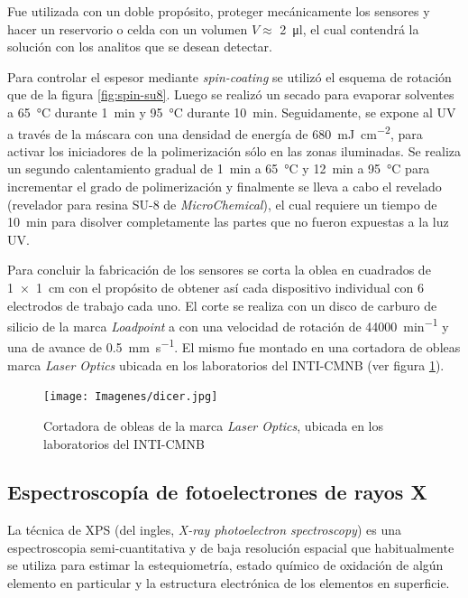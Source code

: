 		Fue utilizada con un doble propósito, proteger mecánicamente los sensores y hacer un reservorio o celda con un volumen  $V \approx$ \SI{2}{\ul}, el cual contendrá la solución con los analitos que se desean detectar.  
			
			
		Para controlar el espesor mediante \textit{spin-coating} se utilizó el esquema de rotación que de la figura \ref{fig:spin-su8}. Luego se realizó un secado para evaporar solventes a \SI{65}{\celsius} durante \SI{1}{\minute} y \SI{95}{\celsius} durante \SI{10}{\minute}. Seguidamente, se expone al UV a través de la máscara con una densidad de energía de \SI{680}{mJ.cm^{-2}}, para activar los iniciadores de la polimerización sólo en las zonas iluminadas. Se realiza un segundo calentamiento gradual de \SI{1}{\minute} a \SI{65}{\celsius} y \SI{12}{\minute} a \SI{95}{\celsius} para incrementar el grado de polimerización y finalmente se lleva a cabo el revelado (revelador para resina SU-8 de \textit{MicroChemical}), el cual requiere un tiempo de \SI{10}{\minute} para disolver completamente las partes que no fueron expuestas a la luz UV. 
		
		Para concluir la fabricación de los sensores se corta la oblea en cuadrados de \SI{1x1}{\cm} con el propósito de obtener así cada dispositivo individual con 6 electrodos de trabajo cada uno. El corte se realiza con un disco de carburo de silicio de la marca \textit{Loadpoint} a con una velocidad de rotación de \SI{44000}{\minute^{-1}} y una de avance de \SI{0.5}{\mm\per\second}. El mismo fue montado en una cortadora de obleas marca \textit{Laser Optics} ubicada en los laboratorios del INTI-CMNB (ver figura \ref{fig:dicer}).

			\begin{figure}[h!]
			 		  \begin{center}
			 		  \texttt{[image: Imagenes/dicer.jpg]}
			 		  \caption[Cortadora de obleas]{Cortadora de obleas de la marca \textit{Laser Optics}, ubicada en los laboratorios del INTI-CMNB}
			 		  \label{fig:dicer}
			 		  \end{center}
			 		  \end{figure}
		
	
	\subsection{Espectroscopía de fotoelectrones de rayos X}

		La técnica de XPS (del ingles, \textit {X-ray photoelectron spectroscopy}) es una espectroscopia semi-cuantitativa y de baja resolución espacial que habitualmente se utiliza para estimar la estequiometría, estado químico de oxidación de algún elemento en particular y la estructura electrónica de los elementos en superficie.\cite{siegbahn1956,siegbahn1981}

